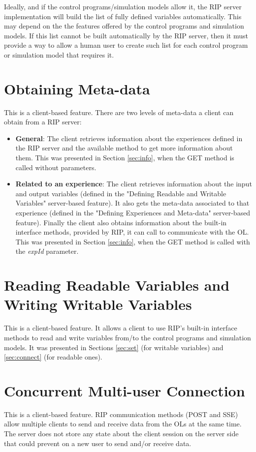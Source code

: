 Ideally, and if the control programs/simulation models allow it, the RIP server implementation will build the list of fully defined variables automatically. This may depend on the the features offered by the control programs and simulation models. If this list cannot be built automatically by the RIP server, then it must provide a way to allow a human user to create such list for each control program or simulation model that requires it.

\section{Obtaining Meta-data}
This is a client-based feature. There are two levels of meta-data a client can obtain from a RIP server:

\begin{itemize}
    \item \textbf{General}: The client retrieves information about the experiences defined in the RIP server and the available method to get more information about them. This was presented in Section \ref{sec:info}, when the GET method is called without parameters.
    \item \textbf{Related to an experience}: The client retrieves information about the input and output variables (defined in the "Defining Readable and Writable Variables" server-based feature). It also gets the meta-data associated to that experience (defined in the "Defining Experiences and Meta-data" server-based feature). Finally the client also obtains information about the built-in interface methods, provided by RIP, it can call to communicate with the OL. This was presented in Section \ref{sec:info}, when the GET method is called with the \textit{expId} parameter.
\end{itemize}

\section{Reading Readable Variables and Writing Writable Variables}
This is a client-based feature. It allows a client to use RIP's built-in interface methods to read and write variables from/to the control programs and simulation models. It was presented in Sections \ref{sec:set} (for writable variables) and \ref{sec:connect} (for readable ones).

\section{Concurrent Multi-user Connection}
This is a client-based feature. RIP communication methods (POST and SSE) allow multiple clients to send and receive data from the OLs at the same time. The server does not store any state about the client session on the server side that could prevent on a new user to send and/or receive data.

